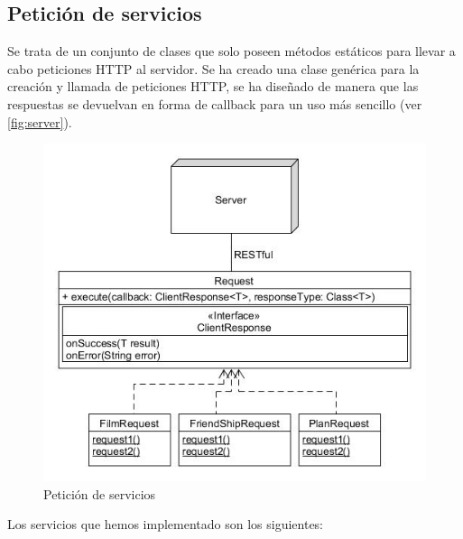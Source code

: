 \subsection{Petición de servicios}
\label{makereference4.4.6}
Se trata de un conjunto de clases que solo poseen métodos estáticos para llevar
 a cabo peticiones HTTP al servidor. Se ha creado una clase genérica para la
 creación y llamada de peticiones HTTP, se ha diseñado de manera que las
 respuestas se devuelvan en forma de callback para un uso más sencillo
 (ver \autoref{fig:server}).
\begin{figure}[H]
    \centering
    \includegraphics[width=6in]{figures/chapter-4/request.jpg}
    \caption{Petición de servicios}
    \label{fig:server}
\end{figure}
Los servicios que hemos implementado son los siguientes:
